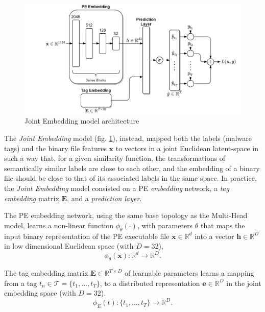 \documentclass[pdfa%
,cucitura%
]{toptesi}
\begin{document}
\begin{figure}[h]
	\centering
	\includegraphics[width=\textwidth]{./images/Joint_Embedding.png}
	\caption[Joint Embedding model architecture]{Joint Embedding model architecture}
	\label{fig:Joint_Embedding_model}
\end{figure}

The \textit{Joint Embedding} model (fig. \ref{fig:Joint_Embedding_model}), instead, mapped both the labels (malware tags) and the binary file features $\textbf{x}$ to vectors in a joint Euclidean latent-space in such a way that, for a given similarity function, the transformations of semantically similar labels are close to each other, and the embedding of a binary file should be close to that of its associated labels in the same space. In practice, the \textit{Joint Embedding} model consisted on a PE \textit{embedding} network, a \textit{tag embedding} matrix $\textbf{E}$, and a \textit{prediction layer}.

The PE embedding network, using the same base topology as the Multi-Head model, learns a non-linear function $\phi_\theta(\cdot)$, with parameters $\theta$ that maps the input binary representation of the PE executable file $\textbf{x} \in \mathbb{R}^d$ into a vector $\textbf{h} \in \mathbb{R}^D$ in low dimensional Euclidean space (with $D=32$),
\begin{equation} \label{eq:jointEmbeddingPEEmbedding}
	\phi_\theta(\textbf{x}) : \mathbb{R}^d \rightarrow \mathbb{R}^D.
\end{equation}

The tag embedding matrix $\textbf{E} \in \mathbb{R}^{T \times D}$ of learnable parameters learns a mapping from a tag $t_n \in \mathcal{T} = \{t_1, ..., t_T\}$, to a distributed representation $\textbf{e} \in \mathbb{R}^D$ in the joint embedding space (with $D=32$).
\begin{equation} \label{eq:jointEmbeddingTagEmbedding}
	\phi_E(t) : \{t_1, ..., t_T\} \rightarrow \mathbb{R}^D.
\end{equation}
\end{document}
